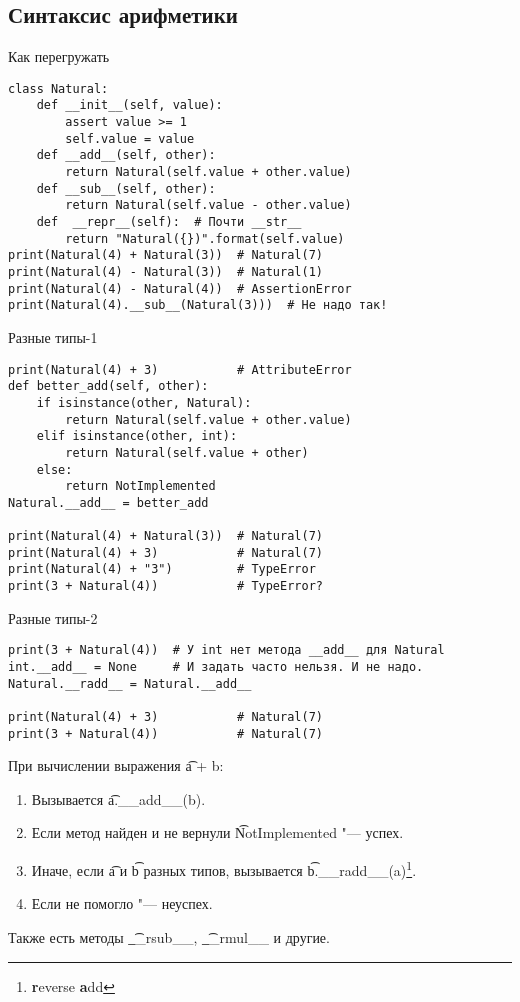 \subsection{Синтаксис арифметики}

\begin{frame}
\end{frame}

\begin{frame}[fragile]{Как перегружать}
\begin{verbatim}
class Natural:
    def __init__(self, value):
        assert value >= 1
        self.value = value
    def __add__(self, other):
        return Natural(self.value + other.value)
    def __sub__(self, other):
        return Natural(self.value - other.value)
    def  __repr__(self):  # Почти __str__
        return "Natural({})".format(self.value)
print(Natural(4) + Natural(3))  # Natural(7)
print(Natural(4) - Natural(3))  # Natural(1)
print(Natural(4) - Natural(4))  # AssertionError
print(Natural(4).__sub__(Natural(3)))  # Не надо так!
\end{verbatim}
\end{frame}

\begin{frame}[fragile]{Разные типы-1}
\begin{verbatim}
print(Natural(4) + 3)           # AttributeError
def better_add(self, other):
    if isinstance(other, Natural):
        return Natural(self.value + other.value)
    elif isinstance(other, int):
        return Natural(self.value + other)
    else:
        return NotImplemented
Natural.__add__ = better_add

print(Natural(4) + Natural(3))  # Natural(7)
print(Natural(4) + 3)           # Natural(7)
print(Natural(4) + "3")         # TypeError
print(3 + Natural(4))           # TypeError?
\end{verbatim}
\end{frame}

\begin{frame}[fragile]{Разные типы-2}
\begin{verbatim}
print(3 + Natural(4))  # У int нет метода __add__ для Natural
int.__add__ = None     # И задать часто нельзя. И не надо.
Natural.__radd__ = Natural.__add__

print(Natural(4) + 3)           # Natural(7)
print(3 + Natural(4))           # Natural(7)
\end{verbatim}

	При вычислении выражения \t{a + b}:
	\begin{enumerate}
		\item Вызывается \t{a.\_\_add\_\_(b)}.
		\item Если метод найден и не вернули \t{NotImplemented} "--- успех.
		\item Иначе, если \t{a} и \t{b} разных типов, вызывается \t{b.\_\_radd\_\_(a)}\footnote{\textbf{r}everse \textbf{a}dd}.
		\item Если не помогло "--- неуспех.
	\end{enumerate}

	Также есть методы \t{\_\_rsub\_\_}, \t{\_\_rmul\_\_} и другие.
\end{frame}

